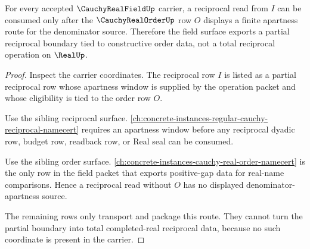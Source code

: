 \begin{theorem}
\label{thm:cauchy-real-field-order-compatible-reciprocal-boundary}
For every accepted $\CauchyRealFieldUp$ carrier, a reciprocal read from $I$ can be consumed only after the $\CauchyRealOrderUp$ row $O$ displays a finite apartness route for the denominator source. Therefore the field surface exports a partial reciprocal boundary tied to constructive order data, not a total reciprocal operation on $\RealUp$.
\end{theorem}
\begin{proof}
Inspect the carrier coordinates. The reciprocal row $I$ is listed as a partial reciprocal row whose apartness window is supplied by the operation packet and whose eligibility is tied to the order row $O$.

Use the sibling reciprocal surface. \autoref{ch:concrete-instances-regular-cauchy-reciprocal-namecert} requires an apartness window before any reciprocal dyadic row, budget row, readback row, or Real seal can be consumed.

Use the sibling order surface. \autoref{ch:concrete-instances-cauchy-real-order-namecert} is the only row in the field packet that exports positive-gap data for real-name comparisons. Hence a reciprocal read without $O$ has no displayed denominator-apartness source.

The remaining rows only transport and package this route. They cannot turn the partial boundary into total completed-real reciprocal data, because no such coordinate is present in the carrier.
\end{proof}

